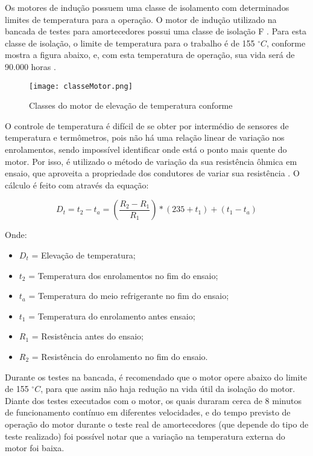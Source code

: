 	Os motores de indução possuem uma classe de isolamento com determinados limites de temperatura para a operação. O motor de indução utilizado na bancada de testes para amortecedores possui uma classe de isolação F \cite{Voges}. Para esta classe de isolação, o limite de temperatura para o trabalho é de 155 $^{\circ}C$, conforme mostra a figura abaixo, e, com esta temperatura de operação, sua vida será de 90.000 horas \cite{ABNT17094}.

	\newpage
	\begin{figure}[!h]
		\centering
		\texttt{[image: classeMotor.png]}
		\caption[Classes do motor de elevação de temperatura conforme NBR 17094:2003]{Classes do motor de elevação de temperatura conforme \cite{ABNT17094}} 
		\label{classeMotor}
	\end{figure}

	O controle de temperatura é difícil de se obter por intermédio de sensores de temperatura e termômetros, pois não há uma relação linear de variação nos enrolamentos, sendo impossível identificar onde está o ponto mais quente do motor. Por isso, é utilizado o método de variação da sua resistência ôhmica em ensaio, que aproveita a propriedade dos condutores de variar sua resistência \cite{WEG05}. O cálculo é feito com através da equação:

	$$ D_{t} = t_{2} - t_{a} = (\frac{R_{2} - R_{1}}{R_{1}}) * (235 + t_{1}) + (t_{1} - t_{a}) $$

	Onde:
	\begin{itemize}
		\item $D_{t}$ = Elevação de temperatura;
		\item $t_{2}$ = Temperatura dos enrolamentos no fim do ensaio;
		\item $t_{a}$ = Temperatura do meio refrigerante no fim do ensaio;
		\item $t_{1}$ = Temperatura do enrolamento antes ensaio;
		\item $R_{1}$ = Resistência antes do ensaio;
		\item $R_{2}$ = Resistência do enrolamento no fim do ensaio.
	\end{itemize}

	Durante os testes na bancada, é recomendado que o motor opere abaixo do limite de 155 $^{\circ}C$, para que assim não haja redução na vida útil da isolação do motor. Diante dos testes executados com o motor, os quais duraram cerca de 8 minutos de funcionamento contínuo em diferentes velocidades, e do tempo previsto de operação do motor durante o teste real de amortecedores (que depende do tipo de teste realizado) foi possível notar que a variação na temperatura externa do motor foi baixa.  

